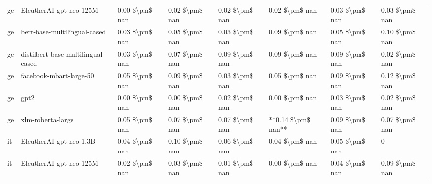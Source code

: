 \begin{tabular}{llllllll}
      ge &            EleutherAI-gpt-neo-125M & 0.00 \$\textbackslash pm\$ nan &            0.02 \$\textbackslash pm\$ nan &        0.02 \$\textbackslash pm\$ nan &         0.02 \$\textbackslash pm\$ nan &                          0.03 \$\textbackslash pm\$ nan &     0.03 \$\textbackslash pm\$ nan \\
      ge &       bert-base-multilingual-cased & 0.03 \$\textbackslash pm\$ nan &            0.05 \$\textbackslash pm\$ nan &        0.03 \$\textbackslash pm\$ nan &         0.09 \$\textbackslash pm\$ nan &                          0.05 \$\textbackslash pm\$ nan &     0.10 \$\textbackslash pm\$ nan \\
      ge & distilbert-base-multilingual-cased & 0.03 \$\textbackslash pm\$ nan &            0.07 \$\textbackslash pm\$ nan &        0.09 \$\textbackslash pm\$ nan &         0.09 \$\textbackslash pm\$ nan &                          0.09 \$\textbackslash pm\$ nan &     0.02 \$\textbackslash pm\$ nan \\
      ge &            facebook-mbart-large-50 & 0.05 \$\textbackslash pm\$ nan &            0.09 \$\textbackslash pm\$ nan &        0.03 \$\textbackslash pm\$ nan &         0.05 \$\textbackslash pm\$ nan &                          0.09 \$\textbackslash pm\$ nan &     0.12 \$\textbackslash pm\$ nan \\
      ge &                               gpt2 & 0.00 \$\textbackslash pm\$ nan &            0.00 \$\textbackslash pm\$ nan &        0.02 \$\textbackslash pm\$ nan &         0.00 \$\textbackslash pm\$ nan &                          0.03 \$\textbackslash pm\$ nan &     0.02 \$\textbackslash pm\$ nan \\
      ge &                  xlm-roberta-large & 0.05 \$\textbackslash pm\$ nan &            0.07 \$\textbackslash pm\$ nan &        0.07 \$\textbackslash pm\$ nan &     **0.14 \$\textbackslash pm\$ nan** &                          0.09 \$\textbackslash pm\$ nan &     0.07 \$\textbackslash pm\$ nan \\
      it &            EleutherAI-gpt-neo-1.3B & 0.04 \$\textbackslash pm\$ nan &            0.10 \$\textbackslash pm\$ nan &        0.06 \$\textbackslash pm\$ nan &         0.04 \$\textbackslash pm\$ nan &                          0.05 \$\textbackslash pm\$ nan &                  0 \\
      it &            EleutherAI-gpt-neo-125M & 0.02 \$\textbackslash pm\$ nan &            0.03 \$\textbackslash pm\$ nan &        0.01 \$\textbackslash pm\$ nan &         0.00 \$\textbackslash pm\$ nan &                          0.04 \$\textbackslash pm\$ nan &     0.09 \$\textbackslash pm\$ nan \\

\end{tabular}
